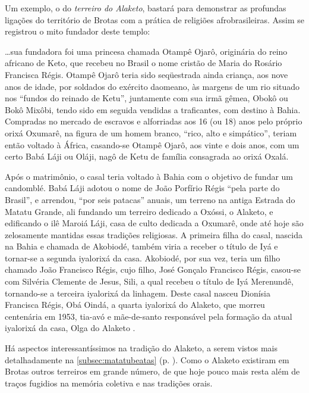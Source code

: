 Um exemplo, o do \textit{terreiro do Alaketo}, bastará para demonstrar as profundas ligações do território de Brotas com a prática de religiões afrobrasileiras. Assim se registrou o mito fundador deste templo:

\begin{citacao}
\dots sua fundadora foi uma princesa chamada Otampê Ojarô, originária do reino africano de Keto, que recebeu no Brasil o nome cristão de Maria do Rosário Francisca Régis. Otampê Ojarô teria sido seqüestrada ainda criança, aos nove anos de idade, por soldados do exército daomeano, às margens de um rio situado nos ``fundos do reinado de Ketu'', juntamente com sua irmã gêmea, Obokô ou Bokô Mixôbi, tendo sido em seguida vendidas a traficantes, com destino à Bahia. Compradas no mercado de escravos e alforriadas aos 16 (ou 18) anos pelo próprio orixá Oxumarê, na figura de um homem branco, ``rico, alto e simpático'', teriam então voltado à África, casando-se Otampê Ojarô, aos vinte e dois anos, com um certo Babá Láji ou Oláji, nagô de Ketu de família consagrada ao orixá Oxalá.

Após o matrimônio, o casal teria voltado à Bahia com o objetivo de fundar um candomblé. Babá Láji adotou o nome de João Porfírio Régis ``pela parte do Brasil'', e arrendou, ``por seis patacas'' anuais, um terreno na antiga Estrada do Matatu Grande, ali fundando um terreiro dedicado a Oxóssi, o Alaketo, e edificando o ilê Maroiá Láji, casa de culto dedicada a Oxumarê, onde até hoje são zelosamente mantidas essas tradições religiosas. A primeira filha do casal, nascida na Bahia e chamada de Akobiodé, também viria a receber o título de Iyá e tornar-se a segunda iyalorixá da casa. Akobiodé, por sua vez, teria um filho chamado João Francisco Régis, cujo filho, José Gonçalo Francisco Régis, casou-se com Silvéria Clemente de Jesus, Sili, a qual recebeu o título de Iyá Merenundê, tornando-se a terceira iyalorixá da linhagem. Deste casal nasceu Dionísia Francisca Régis, Obá Oindá, a quarta iyalorixá do Alaketo, que morreu centenária em 1953, tia-avó e mãe-de-santo responsável pela formação da atual iyalorixá da casa, Olga do Alaketo \cite[p.~345-346]{silveira_alaketo_2003}.
\end{citacao}

Há aspectos interessantíssimos na tradição do Alaketo, a serem vistos mais detalhadamente na \autoref{subsec:matatubeatas} (p. \pageref{subsec:matatubeatas}). Como o Alaketo existiram em Brotas outros terreiros em grande número, de que hoje pouco mais resta além de traços fugidios na memória coletiva e nas tradições orais.

